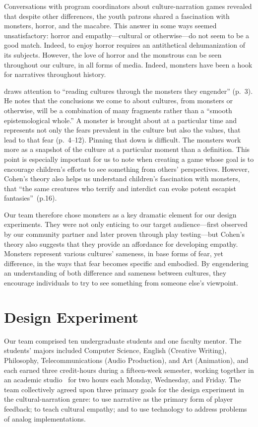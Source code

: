 \documentclass[a4paper]{article}
\begin{document}
Conversations with program coordinators about culture-narration games
revealed that despite other differences, the youth patrons shared a
fascination with monsters, horror, and the macabre.  This answer in
some ways seemed unsatisfactory: horror and empathy---cultural or
otherwise---do not seem to be a good match. Indeed,
to enjoy horror requires an antithetical dehumanization of its subjects.
However, the love of horror and the monstrous can be
seen throughout our culture, in all forms of media. Indeed, monsters have
been a hook for narratives throughout history. 

\citet{Cohen1996} draws attention to ``reading cultures through the
monsters they engender'' (p.~3).  He notes that the conclusions we
come to about cultures, from monsters or otherwise, will be a
combination of many fragments rather than a ``smooth epistemological
whole.'' A monster is brought about at a particular time and
represents not only the fears prevalent in the culture but also the
values, that lead to that fear (p.~4--12). Pinning that down is
difficult. The monsters work more as a snapshot of the culture at
a particular moment than a definition. This point is especially
important for us to note when creating a game whose goal is to
encourage children's efforts to see something from others'
perspectives.
However, Cohen's theory also helps us understand children's fascination
with monsters, that ``the same creatures who terrify and interdict can evoke potent escapist fantasies''~(p.16).

Our team therefore chose monsters as a key dramatic element for our 
design experiments. They were not only enticing to our target
audience---first observed by our community partner and later proven
through play testing---but Cohen's theory also 
suggests that they provide an affordance for
developing empathy. Monsters represent
various cultures' sameness, in base forms of fear, yet difference, in
the ways that fear becomes specific and embodied. By engendering an
understanding of both difference and sameness between cultures, they
encourage individuals to try to see something from someone else's
viewpoint.


\section{Design Experiment}

Our team comprised ten undergraduate students and one faculty mentor.
The students' majors included Computer Science, English
(Creative Writing), Philosophy, Telecommunications (Audio Production),
and Art (Animation), and 
each earned three credit-hours during a fifteen-week
semester,
working together in an academic studio~\citep{Gestwicki2016}
for two hours each Monday, Wednesday, and Friday.
The team collectively agreed upon three primary goals for the design
experiment in the cultural-narration genre:
to use narrative as the primary form of player feedback;
to teach cultural empathy;
and to use technology to address problems of analog implementations.
\end{document}
